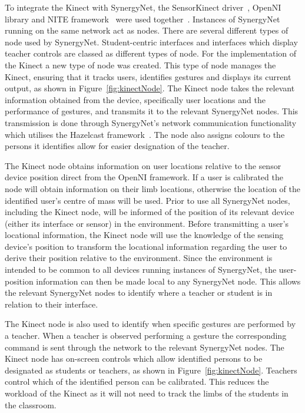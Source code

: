 \documentclass[manuscript, review, screen]{acmart}
\begin{document}
To integrate the Kinect with SynergyNet, the SensorKinect driver~\cite{Avin2011}, OpenNI library and NITE framework~\cite{Organisation2011} were used together~\cite{Davison2012}.
Instances of SynergyNet running on the same network act as nodes.
There are several different types of node used by SynergyNet.
Student-centric interfaces and interfaces which display teacher controls are classed as different types of node.
For the implementation of the Kinect a new type of node was created.
This type of node manages the Kinect, ensuring that it tracks users, identifies gestures and displays its current output, as shown in Figure~\ref{fig:kinectNode}.
The Kinect node takes the relevant information obtained from the device, specifically user locations and the performance of gestures, and transmits it to the relevant SynergyNet nodes.
This transmission is done through SynergyNet's network communication functionality which utilises the Hazelcast framework~\cite{Hazelcast2009}.
The node also assigns colours to the persons it identifies allow for easier designation of the teacher.

The Kinect node obtains information on user locations relative to the sensor device position direct from the OpenNI framework.
If a user is calibrated the node will obtain information on their limb locations, otherwise the location of the identified user's centre of mass will be used.
Prior to use all SynergyNet nodes, including the Kinect node, will be informed of the position of its relevant device (either its interface or sensor) in the environment.
Before transmitting a user's locational information, the Kinect node will use the knowledge of the sensing device's position to transform the locational information regarding the user to derive their position relative to the environment.
Since the environment is intended to be common to all devices running instances of SynergyNet, the user-position information can then be made local to any SynergyNet node.
This allows the relevant SynergyNet nodes to identify where a teacher or student is in relation to their interface.

The Kinect node is also used to identify when specific gestures are performed by a teacher.
When a teacher is observed performing a gesture the corresponding command is sent through the network to the relevant SynergyNet nodes.
The Kinect node has on-screen controls which allow identified persons to be designated as students or teachers, as shown in Figure~\ref{fig:kinectNode}.
Teachers control which of the identified person can be calibrated.
This reduces the workload of the Kinect as it will not need to track the limbs of the students in the classroom.
\end{document}
